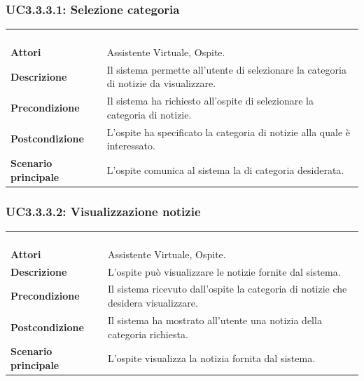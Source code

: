 \subsubsection{UC3.3.3.1: Selezione categoria}
\label{UC3.3.3.1}
\begin{longtable}{l|p{10cm}}
\rowcolor[gray]{0.8} \multicolumn{2}{c}{} \\
\rowcolor[gray]{0.8} \multicolumn{2}{c}{\textbf{UC3.3.3.1 - Selezione categoria}} \\
\rowcolor[gray]{0.8} \multicolumn{2}{c}{} \\
\hline
&\\
\textbf{Attori} & Assistente Virtuale, Ospite.\\[7pt]
\textbf{Descrizione} & Il sistema permette all'utente di selezionare la categoria di notizie da visualizzare.\\[7pt]
\textbf{Precondizione} & Il sistema ha richiesto all'ospite di selezionare la categoria di notizie.\\[7pt]
\textbf{Postcondizione} & L'ospite ha specificato la categoria di notizie alla quale è interessato.\\[7pt]
\textbf{Scenario principale} &L'ospite comunica al sistema la di categoria desiderata.\\[7pt]\hline
\end{longtable}

\subsubsection{UC3.3.3.2: Visualizzazione notizie}
\label{UC3.3.3.2}
\begin{longtable}{l|p{10cm}}
\rowcolor[gray]{0.8} \multicolumn{2}{c}{} \\
\rowcolor[gray]{0.8} \multicolumn{2}{c}{\textbf{UC3.3.3.2 - Visualizzazione notizie}} \\
\rowcolor[gray]{0.8} \multicolumn{2}{c}{} \\
\hline
&\\
\textbf{Attori} & Assistente Virtuale, Ospite.\\[7pt]
\textbf{Descrizione} & L'ospite può visualizzare le notizie fornite dal sistema.\\[7pt]
\textbf{Precondizione} & Il sistema ricevuto dall'ospite la categoria di notizie che desidera visualizzare.\\[7pt]
\textbf{Postcondizione} & Il sistema ha mostrato all'utente una notizia della categoria richiesta.\\[7pt]
\textbf{Scenario principale} &L'ospite visualizza la notizia fornita dal sistema.\\[7pt]\hline
\end{longtable}


